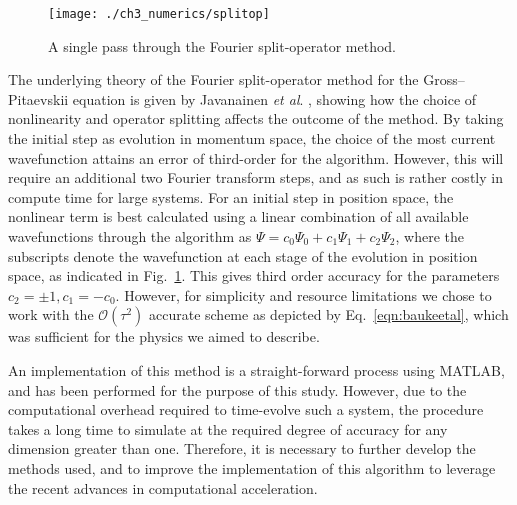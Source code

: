 \begin{figure}
    \centering
    \texttt{[image: ./ch3\_numerics/splitop]}
    \caption{A single pass through the Fourier split-operator method.}
    \label{fig:num_splitop}
\end{figure}

The underlying theory of the Fourier split-operator method for the Gross--Pitaevskii equation is given by Javanainen \textit{et al}. \cite{BEC:Javanainen_jphysa_2006}, showing how the choice of nonlinearity and operator splitting affects the outcome of the method. By taking the initial step as evolution in momentum space, the choice of the most current wavefunction attains an error of third-order for the algorithm. However, this will require an additional two Fourier transform steps, and as such is rather costly in compute time for large systems. For an initial step in position space, the nonlinear term is best calculated using a linear combination of all available wavefunctions through the algorithm as $\Psi = c_0\Psi_0 + c_1\Psi_1 + c_2\Psi_2$, where the subscripts denote the wavefunction at each stage of the evolution in position space, as indicated in Fig.~\ref{fig:num_splitop}. This gives third order accuracy for the parameters $c_2=\pm 1, c_1=-c_0$. However, for simplicity and resource limitations we chose to work with the $\mathcal{O}\left(\tau^2\right)$ accurate scheme as depicted by Eq.~\eqref{eqn:baukeetal}, which was sufficient for the physics we aimed to describe.

An implementation of this method is a straight-forward process using MATLAB, and has been performed for the purpose of this study. However, due to the computational overhead required to time-evolve such a system, the procedure takes a long time to simulate at the required degree of accuracy for any dimension greater than one. Therefore, it is necessary to further develop the methods used, and to improve the implementation of this algorithm to leverage the recent advances in computational acceleration.


